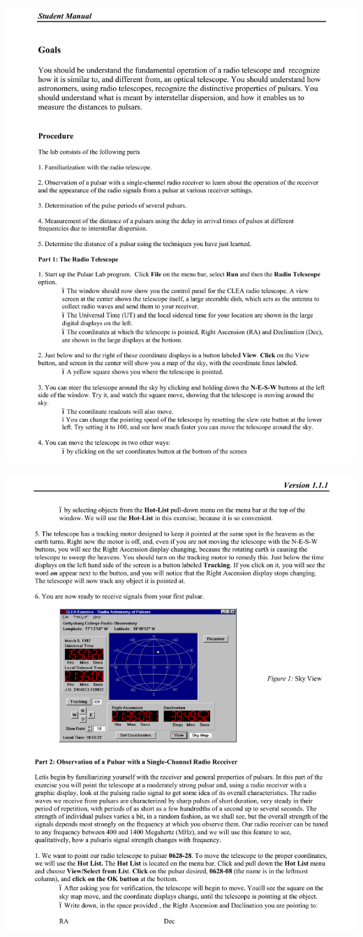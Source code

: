 \includegraphics[width=\textwidth]{pulsars/pulsar2.pdf}
\vfil\eject

\includegraphics[width=\textwidth]{pulsars/pulsar3.pdf}
\vfil\eject

